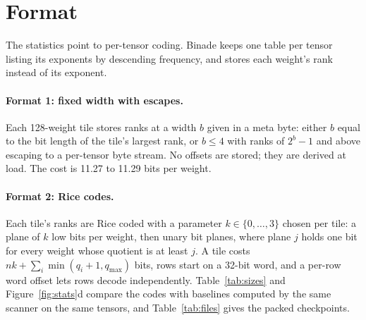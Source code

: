 \documentclass[11pt]{article}
\begin{document}
\section{Format}
\label{sec:format}

The statistics point to per-tensor coding. Binade keeps one table per tensor listing its exponents by descending frequency, and stores each weight's rank instead of its exponent.

\paragraph{Format 1: fixed width with escapes.} Each 128-weight tile stores ranks at a width $b$ given in a meta byte: either $b$ equal to the bit length of the tile's largest rank, or $b \le 4$ with ranks of $2^b-1$ and above escaping to a per-tensor byte stream. No offsets are stored; they are derived at load. The cost is 11.27 to 11.29 bits per weight.

\paragraph{Format 2: Rice codes.} Each tile's ranks are Rice coded with a parameter $k \in \{0,\dots,3\}$ chosen per tile: a plane of $k$ low bits per weight, then unary bit planes, where plane $j$ holds one bit for every weight whose quotient is at least $j$. A tile costs $nk + \sum_i \min(q_i+1, q_{\max})$ bits, rows start on a 32-bit word, and a per-row word offset lets rows decode independently. Table~\ref{tab:sizes} and Figure~\ref{fig:stats}d compare the codes with baselines computed by the same scanner on the same tensors, and Table~\ref{tab:files} gives the packed checkpoints.

\begin{table}[t]
\centering
\caption{Bits per weight of exponent codes on the linear layers (raw byte included). Baselines are our accounting of each layout on the same tensors.}
\label{tab:sizes}
\resizebox{\linewidth}{!}{}
\end{table}

\begin{table}[t]
\centering
\caption{Checkpoints in format 2, with a bit-exact round trip of every tensor.}
\label{tab:files}

\end{table}
\end{document}
